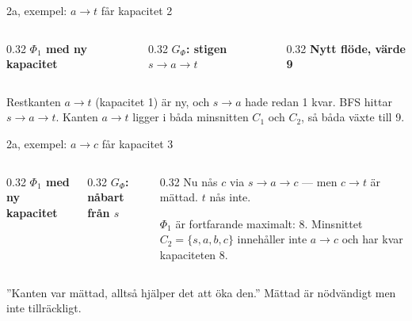 \begin{frame}{2a, exempel: $a\to t$ får kapacitet 2}
\begin{columns}[T]
\begin{column}{0.32\textwidth}
\centering
{\footnotesize\bfseries\color{kthnavy}$\Phi_1$ med ny kapacitet}\par

\end{column}
\begin{column}{0.32\textwidth}
\centering
{\footnotesize\bfseries\color{kthnavy}$G_\Phi$: stigen $s\to a\to t$}\par

\end{column}
\begin{column}{0.32\textwidth}
\centering
{\footnotesize\bfseries\color{kthnavy}Nytt flöde, värde 9}\par

\end{column}
\end{columns}
\vfill
\small
Restkanten $a\to t$ (kapacitet 1) är ny, och $s\to a$ hade redan 1 kvar. BFS hittar
$s\to a\to t$. Kanten $a\to t$ ligger i båda minsnitten $C_1$ och $C_2$, så båda växte till 9.
\end{frame}

\begin{frame}{2a, exempel: $a\to c$ får kapacitet 3}
\begin{columns}[T]
\begin{column}{0.32\textwidth}
\centering
{\footnotesize\bfseries\color{kthnavy}$\Phi_1$ med ny kapacitet}\par

\end{column}
\begin{column}{0.32\textwidth}
\centering
{\footnotesize\bfseries\color{kthnavy}$G_\Phi$: nåbart från $s$}\par

\end{column}
\begin{column}{0.32\textwidth}
\small
Nu nås $c$ via $s\to a\to c$ — men $c\to t$ är mättad. $t$ nås inte.\par\medskip
$\Phi_1$ är fortfarande maximalt: 8. Minsnittet $C_2=\{s,a,b,c\}$ innehåller inte $a\to c$
och har kvar kapaciteten 8.
\end{column}
\end{columns}
\vfill
\begin{missbox}
”Kanten var mättad, alltså hjälper det att öka den.” Mättad är nödvändigt men inte tillräckligt.
\end{missbox}
\end{frame}

